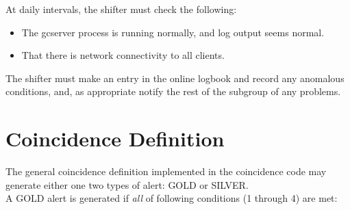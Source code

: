 \documentclass{article}
\begin{document}
At daily intervals, the shifter must check the following:

\begin{itemize}
\item The gcserver process is running normally, and log output seems normal.
\item That there is network connectivity to all clients.

\end{itemize}

The shifter must make an entry in the online logbook and record any
anomalous conditions, and, as appropriate notify the rest of the subgroup
of any problems.



\section{Coincidence Definition}

The general coincidence definition implemented in the coincidence code
may generate either one two types of alert: GOLD or SILVER.\\
A GOLD alert is generated if {\it all} of
following conditions (1 through 4) are met:
\end{document}
